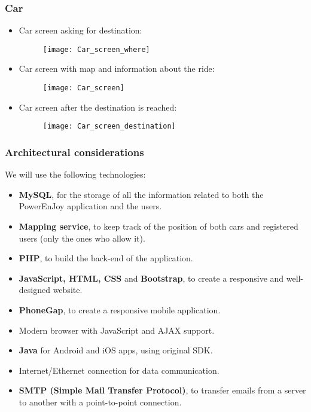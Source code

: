 \subsubsection{Car}
\begin{itemize}
	\item Car screen asking for destination:
	\begin{figure}[H]
		\centering
		\texttt{[image: Car\_screen\_where]}
	\end{figure}
\newpage
	\item Car screen with map and information about the ride:
	\begin{figure}[H]
		\centering
		\texttt{[image: Car\_screen]}
	\end{figure}
\newpage
\item Car screen after the destination is reached:
\begin{figure}[H]
	\centering
	\texttt{[image: Car\_screen\_destination]}
\end{figure}
\end{itemize}
\newpage
\subsubsection{Architectural considerations}
We will use the following technologies:
\begin{itemize}
	\item \textbf{MySQL}, for the storage of all the information related to both the PowerEnJoy application and the users.
	\item \textbf{Mapping service}, to keep track of the position of both cars and registered users (only the ones who allow it). 
	\item \textbf{PHP}, to build the back-end of the application. 
	\item \textbf{JavaScript, HTML, CSS} and \textbf{Bootstrap}, to create a responsive and well-designed website.
	\item \textbf{PhoneGap}, to create a responsive mobile application. 
	\item Modern browser with JavaScript and AJAX support.
	\item \textbf{Java} for Android and iOS apps, using original SDK.
	\item Internet/Ethernet connection for data communication.
	\item \textbf{SMTP (Simple Mail Transfer Protocol)}, to transfer emails from a server to another with a point-to-point connection. 
\end{itemize}
